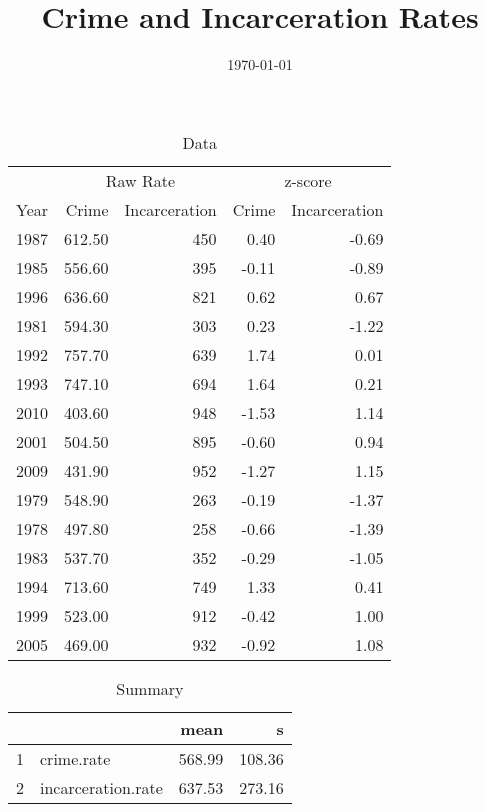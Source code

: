 \documentclass{exam}
\author{}
\title{Crime and Incarceration Rates}
\date{\today}
\begin{document}
  \maketitle

  \begin{table}[H]
    \centering
    \begin{tabular}{rrrrr}
      \toprule
      & \multicolumn{2}{c}{Raw Rate} & \multicolumn{2}{c}{z-score } \\
      \cmidrule(r){2-3} \cmidrule(r){4-5} 
      Year & Crime  & Incarceration & Crime & Incarceration \\
      \midrule
      1987 & 612.50 & 450           & 0.40  & -0.69 \\
      1985 & 556.60 & 395           & -0.11 & -0.89 \\
      1996 & 636.60 & 821           & 0.62  & 0.67 \\
      1981 & 594.30 & 303           & 0.23  & -1.22 \\
      1992 & 757.70 & 639           & 1.74  & 0.01 \\
      1993 & 747.10 & 694           & 1.64  & 0.21 \\
      2010 & 403.60 & 948           & -1.53 & 1.14 \\
      2001 & 504.50 & 895           & -0.60 & 0.94 \\
      2009 & 431.90 & 952           & -1.27 & 1.15 \\
      1979 & 548.90 & 263           & -0.19 & -1.37 \\
      1978 & 497.80 & 258           & -0.66 & -1.39 \\
      1983 & 537.70 & 352           & -0.29 & -1.05 \\
      1994 & 713.60 & 749           & 1.33  & 0.41 \\
      1999 & 523.00 & 912           & -0.42 & 1.00 \\
      2005 & 469.00 & 932           & -0.92 & 1.08 \\
      \bottomrule
    \end{tabular}
    \caption{Data}
  \end{table}

  \begin{table}[ht]
    \centering
    \begin{tabular}{rlrr}
      \toprule
         &                    & mean   & s \\
      \midrule
      1  & crime.rate         & 568.99 & 108.36 \\
      2  & incarceration.rate & 637.53 & 273.16 \\
      \bottomrule
    \end{tabular}
    \caption{Summary}
  \end{table}
\end{document}

